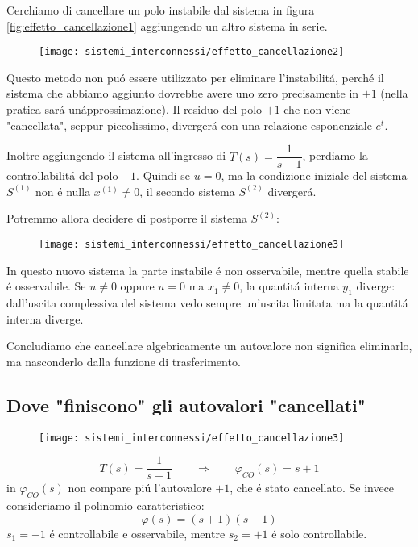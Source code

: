 \documentclass[../main.tex]{subfiles}
\begin{document}
		Cerchiamo di cancellare un polo instabile dal sistema in figura \ref{fig:effetto_cancellazione1} aggiungendo un altro sistema in serie.
		\begin{figure}[H]
			\centering\texttt{[image: sistemi\_interconnessi/effetto\_cancellazione2]}
			\label{fig:effetto_cancellazione2}
		\end{figure}
	
		Questo metodo non pu\'o essere utilizzato per eliminare l'instabilit\'a, perch\'e il sistema che abbiamo aggiunto dovrebbe avere uno zero precisamente in $ +1 $ (nella pratica sar\'a un\'approssimazione). Il residuo del polo $ +1 $ che non viene "cancellata", seppur piccolissimo, diverger\'a con una relazione esponenziale $ e^t $.
		
		Inoltre aggiungendo il sistema all'ingresso di $ T(s)=\dfrac{1}{s-1} $, perdiamo la controllabilit\'a del polo $ +1 $. Quindi se $ u = 0 $, ma la condizione iniziale del sistema $ S^{(1)} $ non \'e nulla $ x^{(1)} \neq 0 $, il secondo sistema $ S^{(2)} $ diverger\'a.
		
		Potremmo allora decidere di postporre il sistema $ S^{(2)} $:
		\begin{figure}[H]
			\centering\texttt{[image: sistemi\_interconnessi/effetto\_cancellazione3]}
			\label{fig:effetto_cancellazione3}
		\end{figure}
	
		In questo nuovo sistema la parte instabile \'e non osservabile, mentre quella stabile \'e osservabile. Se $ u \neq 0 $ oppure $ u = 0 $ ma $ x_1 \neq 0 $, la quantit\'a interna $ y_1 $ diverge: dall'uscita complessiva del sistema vedo sempre un'uscita limitata ma la quantit\'a interna diverge.
		
		Concludiamo che cancellare algebricamente un autovalore non significa eliminarlo, ma nasconderlo dalla funzione di trasferimento.
		
	\subsection{Dove "finiscono" gli autovalori "cancellati"}
		\begin{figure}[H]
			\centering\texttt{[image: sistemi\_interconnessi/effetto\_cancellazione3]}
		\end{figure}
		\[
			T(s) = \dfrac{1}{s+1}
			\qquad\Rightarrow\qquad
			\varphi_{CO}(s)=s+1
		\]
		in $ \varphi_{CO}(s) $ non compare pi\'u l'autovalore $ +1 $, che \'e stato cancellato. Se invece consideriamo il polinomio caratteristico:
		\[
			\varphi(s)=(s+1)(s-1)
		\]
		$ s_1 = -1 $ \'e controllabile e osservabile, mentre $ s_2 = +1 $ \'e solo controllabile.
		
\end{document}
